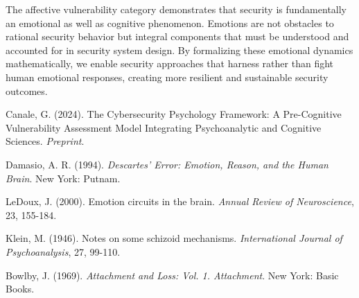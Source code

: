 \documentclass[11pt,a4paper]{article}
\begin{document}
The affective vulnerability category demonstrates that security is fundamentally an emotional as well as cognitive phenomenon. Emotions are not obstacles to rational security behavior but integral components that must be understood and accounted for in security system design. By formalizing these emotional dynamics mathematically, we enable security approaches that harness rather than fight human emotional responses, creating more resilient and sustainable security outcomes.

\begin{thebibliography}{9}

Canale, G. (2024). The Cybersecurity Psychology Framework: A Pre-Cognitive Vulnerability Assessment Model Integrating Psychoanalytic and Cognitive Sciences. \textit{Preprint}.

Damasio, A. R. (1994). \textit{Descartes' Error: Emotion, Reason, and the Human Brain}. New York: Putnam.

LeDoux, J. (2000). Emotion circuits in the brain. \textit{Annual Review of Neuroscience}, 23, 155-184.

Klein, M. (1946). Notes on some schizoid mechanisms. \textit{International Journal of Psychoanalysis}, 27, 99-110.

Bowlby, J. (1969). \textit{Attachment and Loss: Vol. 1. Attachment}. New York: Basic Books.

\end{thebibliography}
\end{document}
